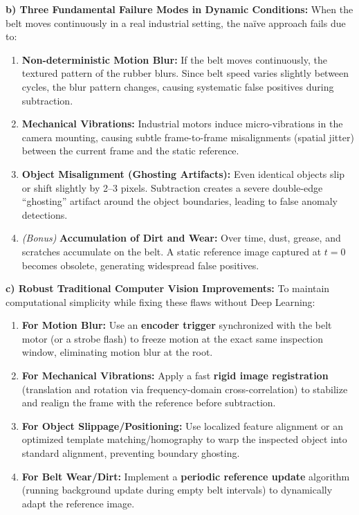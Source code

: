 \textbf{b) Three Fundamental Failure Modes in Dynamic Conditions:}
When the belt moves continuously in a real industrial setting, the naïve approach fails due to:
\begin{enumerate}
    \item \textbf{Non-deterministic Motion Blur:} If the belt moves continuously, the textured pattern of the rubber blurs. Since belt speed varies slightly between cycles, the blur pattern changes, causing systematic false positives during subtraction.
    \item \textbf{Mechanical Vibrations:} Industrial motors induce micro-vibrations in the camera mounting, causing subtle frame-to-frame misalignments (spatial jitter) between the current frame and the static reference.
    \item \textbf{Object Misalignment (Ghosting Artifacts):} Even identical objects slip or shift slightly by 2--3 pixels. Subtraction creates a severe double-edge ``ghosting'' artifact around the object boundaries, leading to false anomaly detections.
    \item \textit{(Bonus)} \textbf{Accumulation of Dirt and Wear:} Over time, dust, grease, and scratches accumulate on the belt. A static reference image captured at $t=0$ becomes obsolete, generating widespread false positives.
\end{enumerate}

\textbf{c) Robust Traditional Computer Vision Improvements:}
To maintain computational simplicity while fixing these flaws without Deep Learning:
\begin{enumerate}
    \item \textbf{For Motion Blur:} Use an \textbf{encoder trigger} synchronized with the belt motor (or a strobe flash) to freeze motion at the exact same inspection window, eliminating motion blur at the root.
    \item \textbf{For Mechanical Vibrations:} Apply a fast \textbf{rigid image registration} (translation and rotation via frequency-domain cross-correlation) to stabilize and realign the frame with the reference before subtraction.
    \item \textbf{For Object Slippage/Positioning:} Use localized feature alignment or an optimized template matching/homography to warp the inspected object into standard alignment, preventing boundary ghosting.
    \item \textbf{For Belt Wear/Dirt:} Implement a \textbf{periodic reference update} algorithm (running background update during empty belt intervals) to dynamically adapt the reference image.
\end{enumerate}

